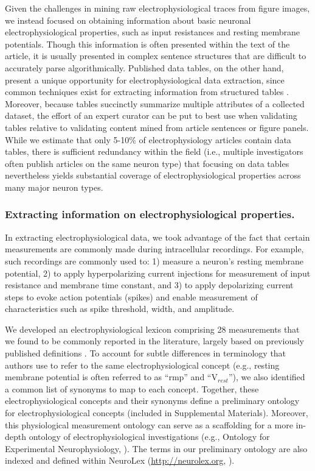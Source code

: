 \documentclass{template/frontiersSCNS} %
\begin{document}
Given the challenges in mining raw electrophysiological traces from figure images, we instead focused on obtaining information about basic neuronal electrophysiological properties, such as input resistances and resting membrane potentials.  
Though this information is often presented within the text of the article, it is usually presented in complex sentence structures that are difficult to accurately parse algorithmically.  
Published data tables, on the other hand, present a unique opportunity for electrophysiological data extraction, since common techniques exist for extracting information from structured tables \citep{yarkoni_large-scale_2011}.  
Moreover, because tables succinctly summarize multiple attributes of a collected dataset, the effort of an expert curator can be put to best use when validating tables relative to validating content mined from article sentences or figure panels.  
While we estimate that only 5-10\% of electrophysiology articles contain data tables, there is sufficient redundancy within the field (i.e., multiple investigators often publish articles on the same neuron type) that focusing on data tables nevertheless yields substantial coverage of electrophysiological properties across many major neuron types.

\subsubsection{Extracting information on electrophysiological properties.}
\label{sec:ephys_extraction}
In extracting electrophysiological data, we took advantage of the fact that certain measurements are commonly made during intracellular recordings.  
For example, such recordings are commonly used to: 
1) measure a neuron's resting membrane potential, 
2) to apply hyperpolarizing current injections for measurement of input resistance and membrane time constant, and 
3) to apply depolarizing current steps to evoke action potentials (spikes) and enable measurement of characteristics such as spike threshold, width, and amplitude.

We developed an electrophysiological lexicon comprising 28 measurements that we found to be commonly reported in the literature, largely based on previously published definitions \citep{toledo-rodriguez_correlation_2004,ascoli_petilla_2008}.  
To account for subtle differences in terminology that authors use to refer to the same electrophysiological concept (e.g., resting membrane potential is often referred to as ``rmp'' and ``V$_{rest}$''), we also identified a common list of synonyms to map to each concept.  
Together, these electrophysiological concepts and their synonyms define a preliminary ontology for electrophysiological concepts (included in Supplemental Materials).  
Moreover, this physiological measurement ontology can serve as a scaffolding for a more in-depth ontology of electrophysiological investigations (e.g., Ontology for Experimental Neurophysiology, \citet{bruha_ontology_2013}). 
The terms in our preliminary ontology are also indexed and defined within NeuroLex (\url{http://neurolex.org}, \citep{larson_neurolex.org:_2013}).   
  
\end{document}
